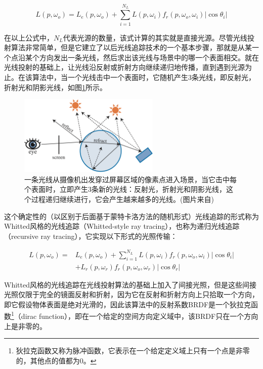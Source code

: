 \begin{equation}
	L(p,\omega_o)=L_e(p, \omega_o)+\sum_{i=1}^{N_L}L(p,\omega_i) f_r(p,\omega_o,\omega_i)|\cos\theta_i|
\end{equation}

\noindent 在以上公式中，$N_L$代表光源的数量，该式计算的其实就是直接光源。尽管光线投射算法非常简单，但是它建立了以后光线追踪技术的一个基本步骤，那就是从某一个点沿某个方向发出一条光线，然后求出该光线与场景中的哪一个表面相交。\cite{a:ray-tracing}就在光线投射的基础上，让光线沿反射或折射方向继续递归地传播，直到遇到光源为止。在该算法中，当一个光线击中一个表面时，它随机产生3条光线，即反射光，折射光和阴影光线，如图\ref{f:pt-recursive-ray-tracing}所示。

\begin{figure}
\sidecaption
	\includegraphics[width=0.6\textwidth]{figures/pt/path-2}
	\caption{一条光线从摄像机出发穿过屏幕区域的像素点进入场景，当它击中每个表面时，立即产生3条新的光线：反射光，折射光和阴影光线，这个过程递归继续进行，它会产生越来越多的光线。(图片来自\cite{b:rtr})}
	\label{f:pt-recursive-ray-tracing}
\end{figure}

这个确定性的（以区别于后面基于蒙特卡洛方法的随机形式）光线追踪的形式称为Whitted风格的光线追踪（Whitted-style ray tracing），也称为递归光线追踪（recursive ray tracing），它实现以下形式的光照传输：

\begin{equation}
\begin{aligned}
	L(p,\omega_o)=&L_e(p, \omega_o)+\sum_{i=1}^{N_L}L(p,\omega_i) f_r(p,\omega_o,\omega_i)|\cos\theta_i|\\
	&+L_r(p,\omega_r)f_r(p,\omega_o,\omega_r)|\cos\theta_r|
\end{aligned}
\end{equation}

Whitted风格的光线追踪在光线投射算法的基础上加入了间接光照，但是这些间接光照仅限于完全的镜面反射和折射，因为它在反射和折射方向上只拾取一个方向，即它假设物体表面是绝对光滑的，因此该算法中的反射系数BRDF是一个狄拉克函数\footnote{狄拉克函数又称为脉冲函数，它表示在一个给定定义域上只有一个点是非零的，其他点的值都为0。}（dirac function），即在一个给定的空间方向定义域中，该BRDF只在一个方向上是非零的。

